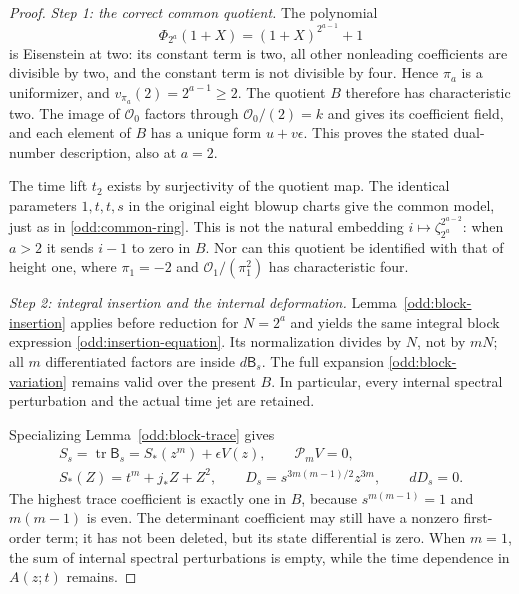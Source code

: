\begin{proof}
\emph{Step 1: the correct common quotient.}
The polynomial
\[
 \Phi_{2^a}(1+X)=(1+X)^{2^{a-1}}+1
\]
is Eisenstein at two: its constant term is two, all other
nonleading coefficients are divisible by two, and the constant
term is not divisible by four. Hence $\pi_a$ is a uniformizer,
and $v_{\pi_a}(2)=2^{a-1}\ge2$. The quotient $B$ therefore has
characteristic two. The image of $\mathcal O_0$ factors through
$\mathcal O_0/(2)=k$ and gives its coefficient field, and each
element of $B$ has a unique form $u+v\epsilon$. This proves the
stated dual-number description, also at $a=2$.

The time lift $t_2$ exists by surjectivity of the quotient map.
The identical parameters $1,t,t,s$ in the original eight blowup
charts give the common model, just as in
\eqref{odd:common-ring}. This is not the natural embedding
$i\mapsto\zeta_{2^a}^{2^{a-2}}$: when $a>2$ it sends $i-1$
to zero in $B$. Nor can this quotient be identified with that
of height one, where $\pi_1=-2$ and
$\mathcal O_1/(\pi_1^2)$ has characteristic four.

\emph{Step 2: integral insertion and the internal deformation.}
Lemma~\ref{odd:block-insertion} applies before reduction for
$N=2^a$ and yields the same integral block expression
\eqref{odd:insertion-equation}. Its normalization divides by
$N$, not by $mN$; all $m$ differentiated factors are inside
$d\mathsf B_s$. The full expansion
\eqref{odd:block-variation} remains valid over the present $B$.
In particular, every internal spectral perturbation and the
actual time jet are retained.

Specializing Lemma~\ref{odd:block-trace} gives
\begin{equation}
 \begin{gathered}
 S_s=\operatorname{tr}\mathsf B_s
     =S_*(z^m)+\epsilon V(z),\qquad \mathcal P_mV=0,\\
 S_*(Z)=t^m+j_*Z+Z^2,\qquad
 D_s=s^{3m(m-1)/2}z^{3m},\qquad dD_s=0.
 \end{gathered}
 \label{two:internal-trace}
\end{equation}
The highest trace coefficient is exactly one in $B$, because
$s^{m(m-1)}=1$ and $m(m-1)$ is even. The determinant coefficient
may still have a nonzero first-order term; it has not been
deleted, but its state differential is zero. When $m=1$, the
sum of internal spectral perturbations is empty, while the time
dependence in $A(z;t)$ remains.


\end{proof}
